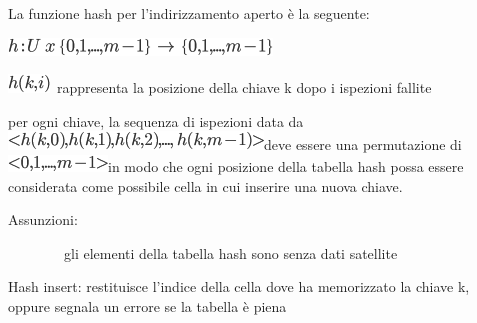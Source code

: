 \documentclass{article}
\begin{document}
{}

{La funzione hash per l'indirizzamento aperto è la seguente:}

\includegraphics{images/image272.png}

\includegraphics{images/image273.png}{~rappresenta la posizione della
chiave k dopo i ispezioni fallite}

{}

{per ogni chiave, la sequenza di ispezioni data da
}\includegraphics{images/image274.png}{deve essere una permutazione di
}\includegraphics{images/image275.png}{in modo che ogni posizione della
tabella hash possa essere considerata come possibile cella in cui
inserire una nuova chiave.}

{}

{Assunzioni:}

{~~~~~~~~gli elementi della tabella hash sono senza dati satellite}

{}

{Hash insert: restituisce l'indice della cella dove ha memorizzato la
chiave k, oppure segnala un errore se la tabella è piena}

{}

\protect\hypertarget{t.7217df0c08ad885ebc654960645bab5fae2cfb4d}{}{}\protect\hypertarget{t.35}{}{}
\end{document}
